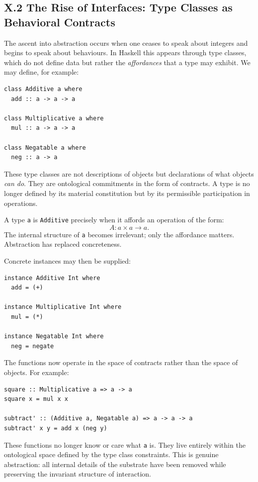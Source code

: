 \documentclass[12pt,letterpaper]{article}
\begin{document}
\subsection{X.2 The Rise of Interfaces: Type Classes as Behavioral Contracts}

The ascent into abstraction occurs when one ceases to speak about integers and begins to speak about behaviours. In Haskell this appears through type classes, which do not define data but rather the \emph{affordances} that a type may exhibit. We may define, for example:

\begin{verbatim}
class Additive a where
  add :: a -> a -> a

class Multiplicative a where
  mul :: a -> a -> a

class Negatable a where
  neg :: a -> a
\end{verbatim}

These type classes are not descriptions of objects but declarations of what objects \emph{can do}. They are ontological commitments in the form of contracts. A type is no longer defined by its material constitution but by its permissible participation in operations.

A type \texttt{a} is \texttt{Additive} precisely when it affords an operation of the form:
\[
A : a \times a \to a.
\]
The internal structure of \texttt{a} becomes irrelevant; only the affordance matters. Abstraction has replaced concreteness.

Concrete instances may then be supplied:

\begin{verbatim}
instance Additive Int where
  add = (+)

instance Multiplicative Int where
  mul = (*)

instance Negatable Int where
  neg = negate
\end{verbatim}

The functions now operate in the space of contracts rather than the space of objects. For example:

\begin{verbatim}
square :: Multiplicative a => a -> a
square x = mul x x

subtract' :: (Additive a, Negatable a) => a -> a -> a
subtract' x y = add x (neg y)
\end{verbatim}

These functions no longer know or care what \texttt{a} is. They live entirely within the ontological space defined by the type class constraints. This is genuine abstraction: all internal details of the substrate have been removed while preserving the invariant structure of interaction.
\end{document}
